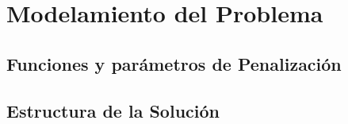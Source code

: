 \chapter*{Modelamiento del Problema}

\section{Funciones y parámetros de Penalización}

\section{Estructura de la Solución}